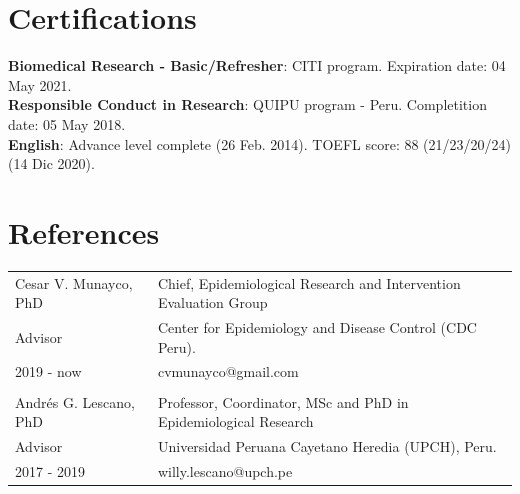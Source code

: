 \documentclass[margin,line]{res}
\begin{document}
\begin{resume}
\section{\sc Certifications}
{\bf Biomedical Research - Basic/Refresher}: CITI program. Expiration date: 04 May 2021.\\
{\bf Responsible Conduct in Research}: QUIPU program - Peru. Completition date: 05 May 2018.\\
{\bf English}: Advance level complete (26 Feb. 2014). TOEFL score: 88 (21/23/20/24) (14 Dic 2020).\\




\section{\sc References }

\begin{tabular}{ l l }
	Cesar V. Munayco, PhD & Chief, Epidemiological Research and Intervention Evaluation Group\\
	Advisor & Center for Epidemiology and Disease Control (CDC Peru).\\
	2019 - now & cvmunayco@gmail.com\\ %
	&\\
	Andr\'es G. Lescano, PhD & Professor, Coordinator, MSc and PhD in Epidemiological Research\\
	Advisor & Universidad Peruana Cayetano Heredia (UPCH), Peru.\\
	2017 - 2019 & willy.lescano@upch.pe\\ %


\end{tabular}
\end{resume}
\end{document}
